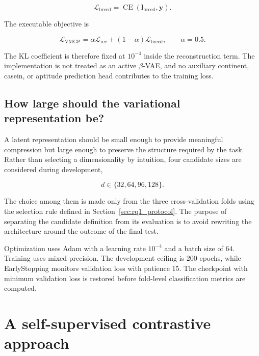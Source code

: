 \begin{equation}
    \mathcal{L}_{\mathrm{breed}}
    =
    \operatorname{CE}
    \left(
        \mathbf{l}_{\mathrm{breed}},
        \mathbf{y}
    \right).
\end{equation}

The executable objective is

\begin{equation}
    \mathcal{L}_{\mathrm{VMGP}}
    =
    \alpha\mathcal{L}_{\mathrm{rec}}
    +
    (1-\alpha)\mathcal{L}_{\mathrm{breed}},
    \qquad
    \alpha=0.5.
    \label{eq:vmgp_total_loss}
\end{equation}

The KL coefficient is therefore fixed at $10^{-4}$ inside the
reconstruction term. The implementation is not treated as an active
$\beta$-VAE, and no auxiliary continent, casein, or aptitude
prediction head contributes to the training loss.

\subsection{How large should the variational representation be?}

A latent representation should be small enough to provide meaningful
compression but large enough to preserve the structure required by the
task. Rather than selecting a dimensionality by intuition, four
candidate sizes are considered during development,

\begin{equation}
    d\in\{32,64,96,128\}.
\end{equation}

The choice among them is made only from the three cross-validation folds
using the selection rule defined in Section~\ref{sec:rq1_protocol}.
The purpose of separating the candidate definition from its evaluation
is to avoid rewriting the architecture around the outcome of the
final test.

Optimization uses Adam with a learning rate $10^{-4}$ and a batch size
of $64$. Training uses mixed precision. The development ceiling is
$200$ epochs, while EarlyStopping monitors validation loss with
patience $15$. The checkpoint with minimum validation loss is restored
before fold-level classification metrics are computed.



\section{A self-supervised contrastive approach}
\label{sec:contrastive_model}

